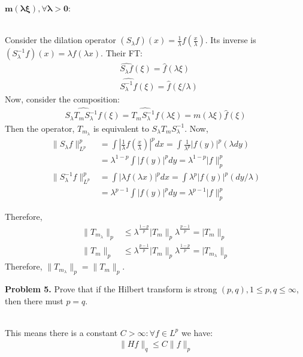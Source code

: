 \documentclass{article}
\begin{document}
$\boldsymbol{m(\lambda\xi), \forall \lambda > 0}$:
\\~

Consider the dilation operator $(S_{\lambda}f)(x) = \frac{1}{\lambda} f(\frac{x}{\lambda})$. Its inverse is $(S_{\lambda}^{-1}f)(x) = \lambda f(\lambda x)$. Their FT:
\begin{align*}
    &\widehat{S_{\lambda}f}(\xi) = \hat{f}(\lambda \xi)\\
    &\widehat{S_{\lambda}^{-1}f}(\xi) = \hat{f}(\xi / \lambda)
\end{align*}
Now, consider the composition:
\begin{gather*}
    \widehat{S_{\lambda}T_m S_{\lambda}^{-1}f}(\xi) = \widehat{T_m S_{\lambda}^{-1}f}(\lambda \xi) = m(\lambda \xi) \hat{f} (\xi) 
\end{gather*}
Then the operator, $T_{m_{\lambda}}$ is equivalent to $S_{\lambda}T_m S_{\lambda}^{-1}$. Now,
\begin{align*}
    \lVert S_{\lambda} f \rVert_{L^p}^p &= \int \left|\frac{1}{\lambda} f(\frac{x}{\lambda}) \right|^pdx = \int \frac{1}{\lambda^p} |f(y)|^p (\lambda dy)\\
    &= \lambda^{1-p}\int |f(y)|^p dy =  \lambda^{1-p} \lvert f\rVert_p^p\\
    \lVert S_{\lambda}^{-1} f \rVert_{L^p}^p &= \int \left|\lambda f(\lambda x) \right|^pdx = \int \lambda^p |f(y)|^p (dy / \lambda)\\
    &= \lambda^{p-1}\int |f(y)|^p dy =  \lambda^{p-1} \lvert f\rVert_p^p
\end{align*}

Therefore,
\begin{align*}
    \lVert T_{m_{\lambda}} \rVert_p &\leq \lambda^{\frac{1-p}{p}} \lvert T_m \rVert_p \lambda^{\frac{p-1}{p}} = \lvert T_m \rVert_p\\
    \lVert T_{m} \rVert_p &\leq \lambda^{\frac{p-1}{p}} \lvert T_m \rVert_p \lambda^{\frac{1-p}{p}} = \lvert T_{m_{\lambda}} \rVert_p
\end{align*}
Therefore, $\lVert T_{m_{\lambda}} \rVert_p = \lVert T_{m} \rVert_p$.

\clearpage


\textbf{Problem 5. } Prove that if the Hilbert transform is strong $(p, q), 1 \leq p, q \leq \infty$, then there must $p = q$.
\\~

This means there is a constant $C > \infty: \forall f \in L^p$ we have:
\begin{gather*}
    \lVert Hf\rVert_q \leq C \lVert f \rVert_p
\end{gather*}
\end{document}
